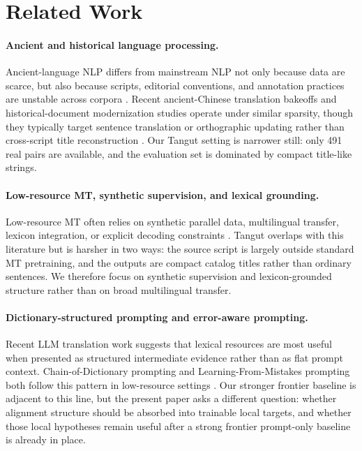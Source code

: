 \section{Related Work}

\paragraph{Ancient and historical language processing.}
Ancient-language NLP differs from mainstream NLP not only because data are scarce, but also because scripts, editorial conventions, and annotation practices are unstable across corpora \cite{sommerschield2023ancient}. Recent ancient-Chinese translation bakeoffs and historical-document modernization studies operate under similar sparsity, though they typically target sentence translation or orthographic updating rather than cross-script title reconstruction \cite{wang2023evahanoverview, domingo2018backtranslation}. Our Tangut setting is narrower still: only 491 real pairs are available, and the evaluation set is dominated by compact title-like strings.

\paragraph{Low-resource MT, synthetic supervision, and lexical grounding.}
Low-resource MT often relies on synthetic parallel data, multilingual transfer, lexicon integration, or explicit decoding constraints \cite{sennrich2016monolingual, gu2018universal, ranathunga2023survey, arthur2016lexicons, hokamp2017lexically}. Tangut overlaps with this literature but is harsher in two ways: the source script is largely outside standard MT pretraining, and the outputs are compact catalog titles rather than ordinary sentences. We therefore focus on synthetic supervision and lexicon-grounded structure rather than on broad multilingual transfer.

\paragraph{Dictionary-structured prompting and error-aware prompting.}
Recent LLM translation work suggests that lexical resources are most useful when presented as structured intermediate evidence rather than as flat prompt context. Chain-of-Dictionary prompting and Learning-From-Mistakes prompting both follow this pattern in low-resource settings \cite{lu2024cod, liao2024lfm}. Our stronger frontier baseline is adjacent to this line, but the present paper asks a different question: whether alignment structure should be absorbed into trainable local targets, and whether those local hypotheses remain useful after a strong frontier prompt-only baseline is already in place.

